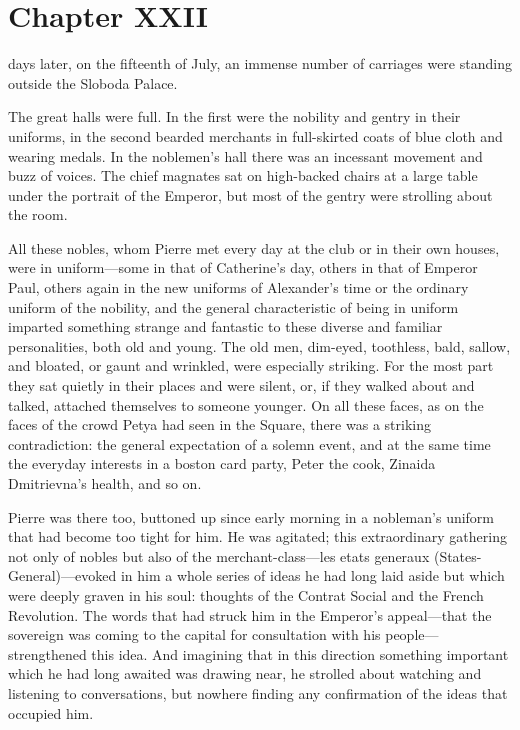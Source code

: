 \chapter*{Chapter XXII}
\ifaudio     
{} 
\fi

 days later, on the fifteenth of July, an immense number of
carriages were standing outside the Sloboda Palace.

The great halls were full. In the first were the nobility and
gentry in their uniforms, in the second bearded merchants in
full-skirted coats of blue cloth and wearing medals. In the
noblemen's hall there was an incessant movement and buzz of
voices. The chief magnates sat on high-backed chairs at a large
table under the portrait of the Emperor, but most of the gentry
were strolling about the room.

All these nobles, whom Pierre met every day at the club or in
their own houses, were in uniform---some in that of Catherine's
day, others in that of Emperor Paul, others again in the new
uniforms of Alexander's time or the ordinary uniform of the
nobility, and the general characteristic of being in uniform
imparted something strange and fantastic to these diverse and
familiar personalities, both old and young. The old men,
dim-eyed, toothless, bald, sallow, and bloated, or gaunt and
wrinkled, were especially striking. For the most part they sat
quietly in their places and were silent, or, if they walked about
and talked, attached themselves to someone younger. On all these
faces, as on the faces of the crowd Petya had seen in the Square,
there was a striking contradiction: the general expectation of a
solemn event, and at the same time the everyday interests in a
boston card party, Peter the cook, Zinaida Dmitrievna's health,
and so on.

Pierre was there too, buttoned up since early morning in a
nobleman's uniform that had become too tight for him. He was
agitated; this extraordinary gathering not only of nobles but
also of the merchant-class---les etats generaux
(States-General)---evoked in him a whole series of ideas he had
long laid aside but which were deeply graven in his soul:
thoughts of the Contrat Social and the French Revolution. The
words that had struck him in the Emperor's appeal---that the
sovereign was coming to the capital for consultation with his
people---strengthened this idea. And imagining that in this
direction something important which he had long awaited was
drawing near, he strolled about watching and listening to
conversations, but nowhere finding any confirmation of the ideas
that occupied him.

